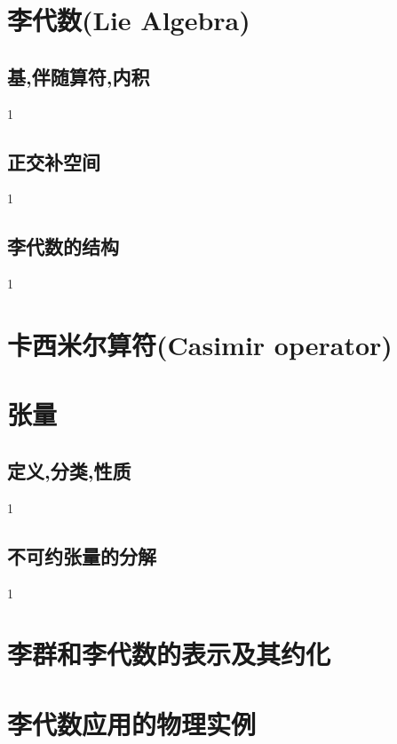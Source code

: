 \section{李代数(Lie Algebra)}
\subsection{基,伴随算符,内积}
1
\subsection{正交补空间}
1
\subsection{李代数的结构}
1
\section{卡西米尔算符(Casimir operator)}
\section{张量}
\subsection{定义,分类,性质}
1
\subsection{不可约张量的分解}
1
\section{李群和李代数的表示及其约化}
	
\section{李代数应用的物理实例}
	
\ifx\allfiles\undefined

	\else
	\fi
